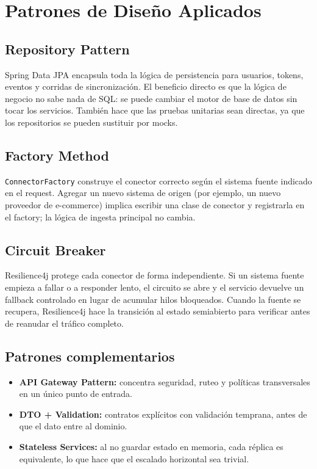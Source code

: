 \documentclass[12pt,a4paper]{article}
\begin{document}
\section{Patrones de Diseño Aplicados}

\subsection{Repository Pattern}

Spring Data JPA encapsula toda la lógica de persistencia para usuarios, tokens, eventos y corridas de sincronización. El beneficio directo es que la lógica de negocio no sabe nada de SQL: se puede cambiar el motor de base de datos sin tocar los servicios. También hace que las pruebas unitarias sean directas, ya que los repositorios se pueden sustituir por mocks.

\subsection{Factory Method}

\texttt{ConnectorFactory} construye el conector correcto según el sistema fuente indicado en el request. Agregar un nuevo sistema de origen (por ejemplo, un nuevo proveedor de e-commerce) implica escribir una clase de conector y registrarla en el factory; la lógica de ingesta principal no cambia.

\subsection{Circuit Breaker}

Resilience4j protege cada conector de forma independiente. Si un sistema fuente empieza a fallar o a responder lento, el circuito se abre y el servicio devuelve un fallback controlado en lugar de acumular hilos bloqueados. Cuando la fuente se recupera, Resilience4j hace la transición al estado semiabierto para verificar antes de reanudar el tráfico completo.

\subsection{Patrones complementarios}

\begin{itemize}[leftmargin=1.2cm]
  \item \textbf{API Gateway Pattern:} concentra seguridad, ruteo y políticas transversales en un único punto de entrada.
  \item \textbf{DTO + Validation:} contratos explícitos con validación temprana, antes de que el dato entre al dominio.
  \item \textbf{Stateless Services:} al no guardar estado en memoria, cada réplica es equivalente, lo que hace que el escalado horizontal sea trivial.
\end{itemize}
\end{document}
